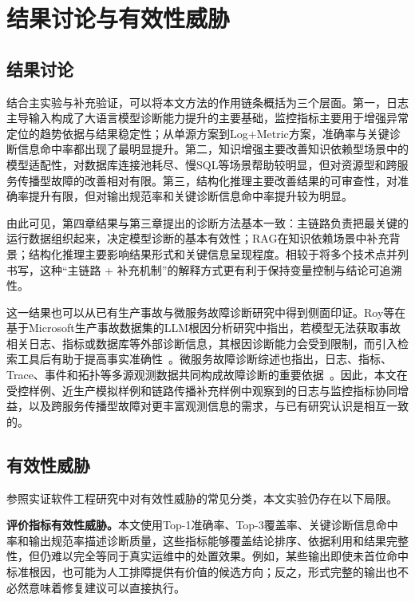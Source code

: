 \section{结果讨论与有效性威胁}

\subsection{结果讨论}

结合主实验与补充验证，可以将本文方法的作用链条概括为三个层面。第一，日志主导输入构成了大语言模型诊断能力提升的主要基础，监控指标主要用于增强异常定位的趋势依据与结果稳定性；从单源方案到Log+Metric方案，准确率与关键诊断信息命中率都出现了最明显提升。第二，知识增强主要改善知识依赖型场景中的模型适配性，对数据库连接池耗尽、慢SQL等场景帮助较明显，但对资源型和跨服务传播型故障的改善相对有限。第三，结构化推理主要改善结果的可审查性，对准确率提升有限，但对输出规范率和关键诊断信息命中率提升较为明显。

由此可见，第四章结果与第三章提出的诊断方法基本一致：主链路负责把最关键的运行数据组织起来，决定模型诊断的基本有效性；RAG在知识依赖场景中补充背景；结构化推理主要影响结果形式和关键信息呈现程度。相较于将多个技术点并列书写，这种“主链路 + 补充机制”的解释方式更有利于保持变量控制与结论可追溯性。

这一结果也可以从已有生产事故与微服务故障诊断研究中得到侧面印证。Roy等在基于Microsoft生产事故数据集的LLM根因分析研究中指出，若模型无法获取事故相关日志、指标或数据库等外部诊断信息，其根因诊断能力会受到限制，而引入检索工具后有助于提高事实准确性~\cite{roy2024agents}。微服务故障诊断综述也指出，日志、指标、Trace、事件和拓扑等多源观测数据共同构成故障诊断的重要依据~\cite{zhang2024fdsurvey}。因此，本文在受控样例、近生产模拟样例和链路传播补充样例中观察到的日志与监控指标协同增益，以及跨服务传播型故障对更丰富观测信息的需求，与已有研究认识是相互一致的。

\subsection{有效性威胁}

参照实证软件工程研究中对有效性威胁的常见分类，本文实验仍存在以下局限。

\textbf{评价指标有效性威胁。}本文使用Top-1准确率、Top-3覆盖率、关键诊断信息命中率和输出规范率描述诊断质量，这些指标能够覆盖结论排序、依据利用和结果完整性，但仍难以完全等同于真实运维中的处置效果。例如，某些输出即使未首位命中标准根因，也可能为人工排障提供有价值的候选方向；反之，形式完整的输出也不必然意味着修复建议可以直接执行。

